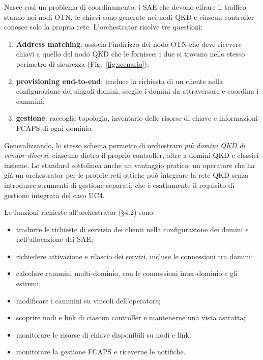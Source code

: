 Nasce così un problema di coordinamento: i SAE che devono cifrare il
traffico stanno nei nodi OTN, le chiavi sono generate nei nodi QKD e
ciascun controller conosce solo la propria rete. L'orchestrator risolve tre
questioni:

\begin{enumerate}
  \item \textbf{Address matching}: associa l'indirizzo del nodo OTN che deve
        ricevere chiavi a quello del nodo QKD che le fornisce; i due si
        trovano nello stesso perimetro di sicurezza (Fig.~\ref{fig:scenario});
  \item \textbf{provisioning end-to-end}: traduce la richiesta di un cliente
        nella configurazione dei singoli domini, sceglie i domini da
        attraversare e coordina i cammini;
  \item \textbf{gestione}: raccoglie topologia, inventario delle risorse di
        chiave e informazioni FCAPS di ogni dominio.
\end{enumerate}

Generalizzando, lo stesso schema permette di orchestrare \emph{più domini
QKD di vendor diversi}, ciascuno dietro il proprio controller, oltre a
domini QKD e classici insieme. Lo standard sottolinea anche un vantaggio
pratico: un operatore che ha già un orchestrator per le proprie reti
ottiche può integrare la rete QKD senza introdurre strumenti di gestione
separati, che è esattamente il requisito di gestione integrata del caso UC4.

Le funzioni richieste all'orchestrator (§4.2) sono:
\begin{itemize}
  \item tradurre le richieste di servizio dei clienti nella configurazione
        dei domini e nell'allocazione dei SAE;
  \item richiedere attivazione e rilascio dei servizi, incluse le
        connessioni tra domini;
  \item calcolare cammini multi-dominio, con le connessioni inter-dominio e
        gli estremi;
  \item modificare i cammini su vincoli dell'operatore;
  \item scoprire nodi e link di ciascun controller e mantenerne una vista
        astratta;
  \item monitorare le risorse di chiave disponibili su nodi e link;
  \item monitorare la gestione FCAPS e riceverne le notifiche.
\end{itemize}

